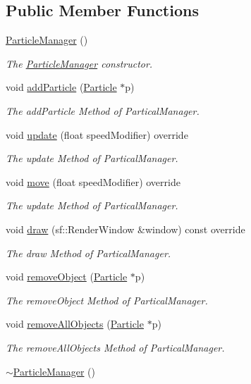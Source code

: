 \subsection*{Public Member Functions}
\begin{DoxyCompactItemize}
\item 
\hyperlink{class_particle_manager_a36f2371b06ef7bd96fc1e0cb1fcebd66}{Particle\+Manager} ()
\begin{DoxyCompactList}\small\item\em The \hyperlink{class_particle_manager}{Particle\+Manager} constructor. \end{DoxyCompactList}\item 
void \hyperlink{class_particle_manager_a651901462992745401596956c790d87d}{add\+Particle} (\hyperlink{class_particle}{Particle} $\ast$p)
\begin{DoxyCompactList}\small\item\em The add\+Particle Method of Partical\+Manager. \end{DoxyCompactList}\item 
void \hyperlink{class_particle_manager_a2c786926fc1cd9992c518b3ea4ee07cb}{update} (float speed\+Modifier) override
\begin{DoxyCompactList}\small\item\em The update Method of Partical\+Manager. \end{DoxyCompactList}\item 
void \hyperlink{class_particle_manager_a77357f72908d4fa5eea451baee1b354d}{move} (float speed\+Modifier) override
\begin{DoxyCompactList}\small\item\em The update Method of Partical\+Manager. \end{DoxyCompactList}\item 
void \hyperlink{class_particle_manager_a03682007d1bedb0f00795026f14a517c}{draw} (sf\+::\+Render\+Window \&window) const override
\begin{DoxyCompactList}\small\item\em The draw Method of Partical\+Manager. \end{DoxyCompactList}\item 
void \hyperlink{class_particle_manager_a1973cc7d0869d695ce1b516dce7584f4}{remove\+Object} (\hyperlink{class_particle}{Particle} $\ast$p)
\begin{DoxyCompactList}\small\item\em The remove\+Object Method of Partical\+Manager. \end{DoxyCompactList}\item 
void \hyperlink{class_particle_manager_a41c792442b70b1f027d9b782fdb73060}{remove\+All\+Objects} (\hyperlink{class_particle}{Particle} $\ast$p)
\begin{DoxyCompactList}\small\item\em The remove\+All\+Objects Method of Partical\+Manager. \end{DoxyCompactList}\item 
\hypertarget{class_particle_manager_a3d3be537ebf5e8d6cd00181bff9dfbd6}{\hyperlink{class_particle_manager_a3d3be537ebf5e8d6cd00181bff9dfbd6}{$\sim$\+Particle\+Manager} ()}\label{class_particle_manager_a3d3be537ebf5e8d6cd00181bff9dfbd6}


\end{DoxyCompactItemize}
